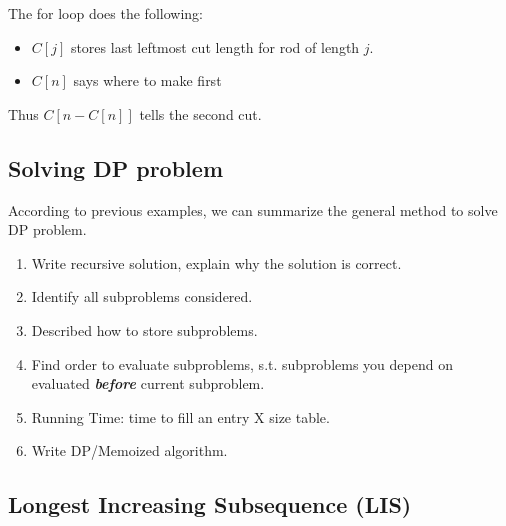 The for loop does the following:
\begin{itemize}
\item $C[j]$ stores last leftmost cut length for rod of length $j$.
\item $C[n]$ says where to make first
\end{itemize}

Thus $C[n - C[n]]$ tells the second cut.

\subsection{Solving DP problem}
According to previous examples, we can summarize the general method to solve DP problem.

\begin{enumerate}
\item Write recursive solution, explain why the solution is correct.
\item Identify all subproblems considered.
\item Described how to store subproblems.
\item Find order to evaluate subproblems, s.t. subproblems you depend on evaluated \textbf{\textit{before}} current subproblem.
\item Running Time: time to fill an entry X size table.
\item Write DP/Memoized algorithm.
\end{enumerate}

\subsection{Longest Increasing Subsequence (LIS)}
